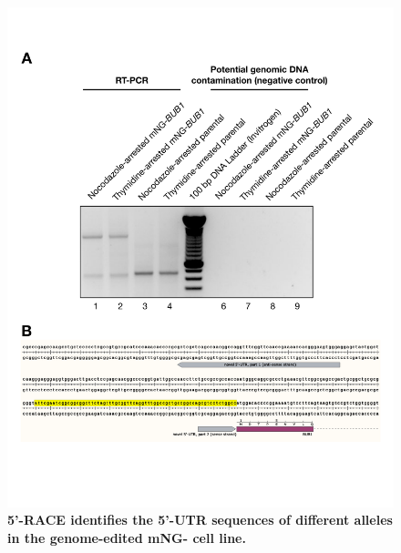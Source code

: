\begin{figure} [b!]
    \centering
    \includegraphics[width=\textwidth]{chapters/figures/5RACE.pdf}
    \caption{\textbf{5'-RACE identifies the 5'-UTR sequences of different  alleles in the genome-edited mNG- cell line.}}
    \label{5RACE}
\end{figure}
